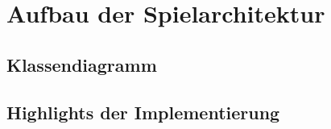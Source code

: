 \section{Aufbau der Spielarchitektur}


\subsection{Klassendiagramm}


\subsection{Highlights der Implementierung}